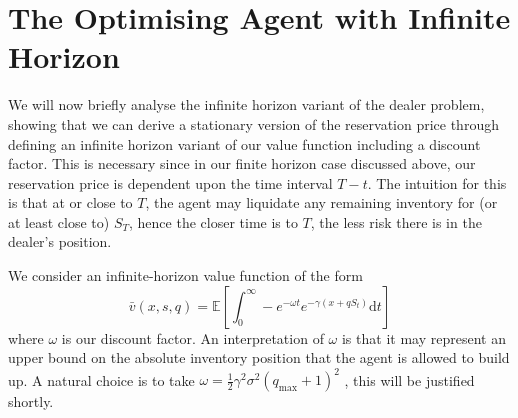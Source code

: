 \section{The Optimising Agent with Infinite Horizon}\label{sec:3.4}
We will now briefly analyse the infinite horizon variant of the dealer problem, showing
that we can derive a stationary version of the reservation price through defining
an infinite horizon variant of our value function including a discount factor. This is
necessary since in our finite horizon case discussed above, our reservation price is
dependent upon the time interval $T-t.$ The intuition for this is that at or close to 
$T$, the agent may liquidate any remaining inventory for (or at least close to) $S_T$,
hence the closer time is to $T$, the less risk there is in the dealer's position.

We consider an infinite-horizon value function of the form
\begin{equation*}
    \bar v(x,s,q)=\mathbb{E}\left[\int_{0}^{\infty}-e^{-\omega t}e^{-\gamma(x+qS_t)}\mathrm dt\right]
\end{equation*}
where $\omega$ is our discount factor. An interpretation of $\omega$ is that it may
represent an upper bound on the absolute inventory position that the agent is allowed
to build up. A natural choice is to take $\omega=\frac{1}{2}\gamma^2\sigma^2(q_{\textrm{max}}+1)^2$
, this will be justified shortly. 

